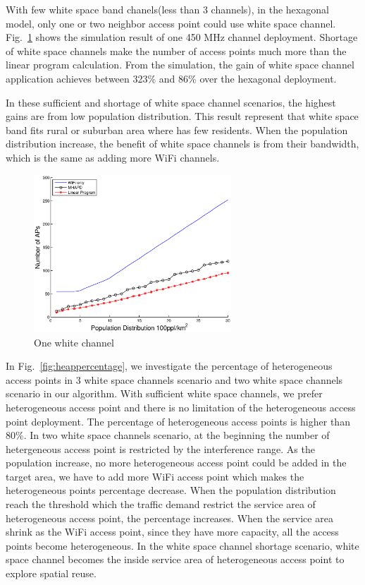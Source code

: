 With few white space band chanels(less than 3 channels), in the hexagonal model, only one or 
two neighbor access point could use white space channel. Fig.~\ref{fig:onewhitechannel}
shows the simulation result of one 450 MHz channel deployment. Shortage of white space channels
make the number of access points much more than the linear program calculation. 
From the simulation, the gain of white space channel application achieves between 323\% and 86\%
over the hexagonal deployment. 

In these sufficient and shortage of white space channel scenarios, the highest gains are from 
low population distribution. This result represent that white space band fits rural or suburban
area where has few residents. When the population distribution increase, the benefit of white space
channels is from their bandwidth, which is the same as adding more WiFi channels.

\begin{figure}
\centering
\includegraphics[width=74mm]{figures/onewhitechannel}
\vspace{-0.1in}
\caption{One white channel}                                                                 
\label{fig:onewhitechannel}
\vspace{-0.1in}
\end{figure}

In Fig.~\ref{fig:heappercentage}, we investigate the percentage of heterogeneous access points
in 3 white space channels scenario and two white space channels scenario in our algorithm. 
With sufficient white space channels, we prefer heterogeneous access point and there is no 
limitation of the heterogeneous access point deployment. The percentage of heterogeneous access points
is higher than 80\%. In two white space channels scenario, at the beginning the number of hetergeneous
access point is restricted by the interference range. As the population increase, no more heterogeneous
access point could be added in the target area, we have to add more WiFi access point which makes the 
heterogeneous points percentage decrease. When the population distribution reach the threshold which
the traffic demand restrict the service area of heterogeneous access point, the percentage increases.
When the service area shrink as the WiFi access point, since they have more capacity, all the access
points become heterogeneous. In the white space channel shortage scenario, white space channel becomes
the inside service area of heterogeneous access point to explore spatial reuse.



